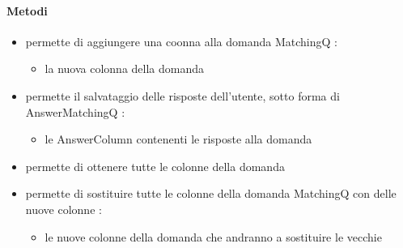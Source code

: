 \paragraph{Metodi}
\begin{itemize}
\item {}
\newline
permette di aggiungere una coonna alla domanda MatchingQ
\newline
{} :
\begin{itemize}
\item {}
\newline
la nuova colonna della domanda
\end{itemize}
\item {}
\newline
permette il salvataggio delle risposte dell'utente, sotto forma di AnswerMatchingQ
\newline
{} :
\begin{itemize}
\item {}
\newline
le AnswerColumn contenenti le risposte alla domanda
\end{itemize}
\item {}
\newline
permette di ottenere tutte le colonne della domanda
\newline
\item {}
\newline
permette di sostituire tutte le colonne della domanda MatchingQ con delle nuove colonne
\newline
{} :
\begin{itemize}
\item {}
\newline
le nuove colonne della domanda che andranno a sostituire le vecchie
\end{itemize}
\end{itemize}
